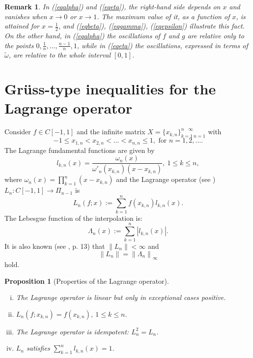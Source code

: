 \documentclass[12pt,leqno,a4paper,dvips,twoside]{article}
\newtheorem{prop}[thm]{Proposition}%
\newtheorem{rema}[thm]{Remark}%
\begin{document}
{\begin{rema}
	In (\ref{eqalpha}) and (\ref{eqeta}), the right-hand side depends on $x$ and vanishes when $x\to 0$ or $x\to 1$. The maximum
	value of it, as a function of $x$, is attained for $x=\frac{1}{2}$, and (\ref{eqbeta}), (\ref{eqgamma}), (\ref{eqepsilon}) illustrate this fact.
	On the other hand, in (\ref{eqalpha}) the oscillations of $f$ and $g$ are relative only to the points $0,\frac{1}{n},\ldots, \frac{n-1}{n},1$, while in
	(\ref{eqeta}) the oscillations, expressed in terms of $\widetilde{\omega}$, are relative to the whole interval $[0,1]$. 
\end{rema}

\section{Gr\"{u}ss-type inequalities for the Lagrange operator}

Consider $f\in C[-1,1]$ and the infinite matrix $X=\{x_{k,n}\}^{n\ \ \ \ \infty}_{k=1 \ n=1}$ with
	\begin{equation*}
		-1\leq x_{1,n}<x_{2,n}<\ldots <x_{n,n}\leq 1, \text{ for } n=1,2,\ldots.
	\end{equation*}
The Lagrange fundamental functions are given by
	\begin{equation*}
		l_{k,n}(x)=\frac{\omega_n(x)}{\omega'_n(x_{k,n})(x-x_{k,n})},\ 1\leq k\leq n,
	\end{equation*}
where $\omega_n(x)=\prod^{n}_{k=1}{(x-x_{k,n})}$ and the Lagrange operator (see \cite{szaver:1990}) $L_n:C[-1,1]\to \Pi_{n-1}$ is
	\begin{equation*}
		L_n(f;x):=\sum^{n}_{k=1}{f(x_{k,n})l_{k,n}(x)}. 
	\end{equation*}
The Lebesgue function of the interpolation is:
	\begin{equation*}
		\Lambda_n(x):=\sum^{n}_{k=1}{\left|l_{k,n}(x)\right|}.
	\end{equation*}
It is also known (see \cite{chelight:2000}, p. 13) that $\left\|L_n\right\|<\infty$ and 
	\begin{equation*}
		\left\|L_n\right\|=\left\|\Lambda_n\right\|_{\infty}
	\end{equation*}
hold. 

\begin{prop}[Properties of the Lagrange operator]\mbox{}

	\begin{enumerate}[i)]
		\item
			The Lagrange operator is linear but only in exceptional cases positive.
		\item
			$L_n( f;x_{k,n})=f(x_{k,n}),\ 1\leq k\leq n$.
		\item
			The Lagrange operator is idempotent: $L^2_n=L_n$.
		\item
			$L_n$ satisfies $\sum^{n}_{k=1}{l_{k,n}(x)}=1$. 
	\end{enumerate}
\end{prop}

}
\end{document}
